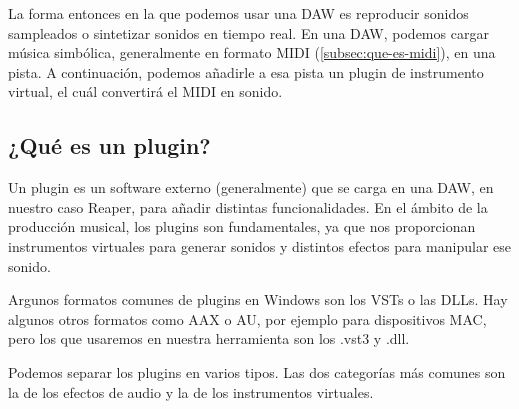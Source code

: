 La forma entonces en la que podemos usar una DAW es reproducir sonidos sampleados o sintetizar sonidos en tiempo real. En una DAW, podemos cargar música simbólica, generalmente en formato MIDI (\ref{subsec:que-es-midi}), en una pista. A continuación, podemos añadirle a esa pista un plugin de instrumento virtual, el cuál convertirá el MIDI en sonido.

\subsection{¿Qué es un plugin?}\label{subsec:plugin}
Un plugin es un software externo (generalmente) que se carga en una DAW, en nuestro caso Reaper, para añadir distintas funcionalidades. En el ámbito de la producción musical, los plugins son fundamentales, ya que nos proporcionan instrumentos virtuales para generar sonidos y distintos efectos para manipular ese sonido.

Argunos formatos comunes de plugins en Windows son los VSTs o las DLLs. Hay algunos otros formatos como AAX o AU, por ejemplo para dispositivos MAC, pero los que usaremos en nuestra herramienta son los .vst3 y .dll. 

Podemos separar los plugins en varios tipos. Las dos categorías más comunes son la de los efectos de audio y la de los instrumentos virtuales. 

